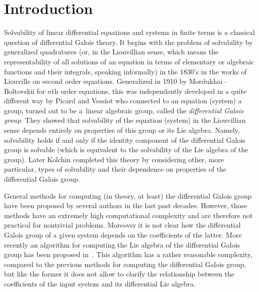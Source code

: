 \section{Introduction}

Solvability of linear differential equations and systems in finite terms is a classical question of
differential Galois theory. It begins with the problem of solvability by generalized quadratures
(or, in the Liouvillian sense, which means the representability of all solutions of an equation in
terms of elementary or algebraic functions and their integrals, speaking informally) in the 1830's
in the works of Liouville on second order equations. Generalized in 1910 by Mordukhai--Boltovskii for
$n$th order equations, this was independently developed in a quite different way by Picard and Vessiot
who connected to an equation (system) a group, turned out to be a~linear algebraic group, called the
{\it differential Galois group}. They showed that solvability of the equation (system) in the Liouvillian
sense depends entirely on properties of this group or its Lie algebra. Namely, solvability holds if and
only if the identity component of the differential Galois group is solvable (which is equivalent to the
solvability of the Lie algebra of the group). Later Kolchin completed this theory by considering other,
more particular, types of solvability and their dependence on properties of the differential Galois group.

General methods for computing (in theory, at least) the differential Galois group have been proposed by several authors \cite{CoSi99,Fe15a,Hr02,Ho07b} in the last past decades. However, those methods have an extremely high computational complexity and are therefore not practical for nontrivial problems. Moreover it is not clear how the differential Galois group of a given system depends on the coefficients of the latter. More recently an algorithm for computing the Lie algebra of the differential Galois group has been proposed in~\cite{BCDW16}. This algorithm has a rather reasonable complexity, compared to the previous methods for computing the differential Galois group, but like the former it does not allow to clarify the relationship between the coefficients of the input system and its differential Lie algebra.

